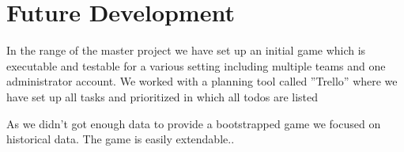 \section{Future Development}
In the range of the master project we have set up an initial game which is executable and testable for a various setting including multiple teams and one administrator account. We worked with a planning tool called ''Trello'' where we have set up all tasks and prioritized in which all todos are listed %

As we didn't got enough data to provide a bootstrapped game we focused on historical data. The game is easily extendable.. 
